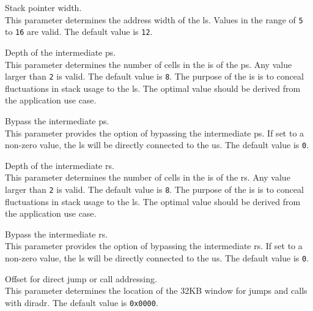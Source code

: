 \begin{description}[style=nextline]

\item[\texttt{SP\_WIDTH}] Stack pointer width. \\
  This parameter determines the address width of the \gls{ls}.
  Values in the range of \texttt{5} to \texttt{16} are valid.
  The default value is \texttt{12}. 
  
\item[\texttt{IPS\_DEPTH}] Depth of the intermediate \gls{ps}. \\
  This parameter determines the number of \glspl{cell} in the \gls{is} of the \gls{ps}.
  Any value larger than \texttt{2} is valid.
  The default value is \texttt{8}. 
  The purpose of the \gls{is} is to conceal fluctuations in stack usage to the \gls{ls}.
  The optimal value should be derived from the application use case.

\item[\texttt{IPS\_BYPASS}] Bypass the intermediate \gls{ps}. \\
  This parameter provides the option of bypassing the intermediate \gls{ps}.
  If set to a non-zero value, the \gls{ls} will be directly connected to the \gls{us}.
  The default value is \texttt{0}. 

\item[\texttt{IRS\_DEPTH}] Depth of the intermediate \gls{rs}. \\
  This parameter determines the number of \glspl{cell} in the \gls{is} of the \gls{rs}.
  Any value larger than \texttt{2} is valid.
  The default value is \texttt{8}. 
  The purpose of the \gls{is} is to conceal fluctuations in stack usage to the \gls{ls}.
  The optimal value should be derived from the application use case.

\item[\texttt{IRS\_BYPASS}] Bypass the intermediate \gls{rs}. \\
  This parameter provides the option of bypassing the intermediate \gls{rs}.
  If set to a non-zero value, the \gls{ls} will be directly connected to the \gls{us}.
  The default value is \texttt{0}. 

\item[\texttt{PBUS\_AADR\_OFFSET}] Offset for direct \gls{jump} or \gls{call} addressing. \\
  This parameter determines the location of the 32KB window for \glspl{jump} and \glspl{call}
  with \gls{diradr}.
  The default value is \texttt{0x0000}. 


\end{description}
